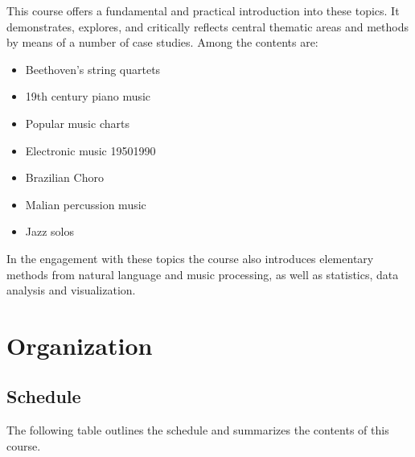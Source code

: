 \documentclass[letterpaper,10pt,english]{sphinxmanual}
\begin{document}
This course offers a fundamental and practical introduction into these topics.
It demonstrates, explores, and critically reflects central thematic areas and methods by means of a number of case studies.
Among the contents are:
\begin{itemize}
\item {} 
Beethoven’s string quartets

\item {} 
19th century piano music

\item {} 
Popular music charts

\item {} 
Electronic music 1950\sphinxhyphen{}1990

\item {} 
Brazilian Choro

\item {} 
Malian percussion music

\item {} 
Jazz solos

\end{itemize}

In the engagement with these topics the course also introduces elementary methods from natural language and music processing,
as well as statistics, data analysis and visualization.


\chapter{Organization}
\label{\detokenize{orga:organization}}\label{\detokenize{orga::doc}}

\section{Schedule}
\label{\detokenize{orga:schedule}}
The following table outlines the schedule and summarizes the contents of this course.
\end{document}
